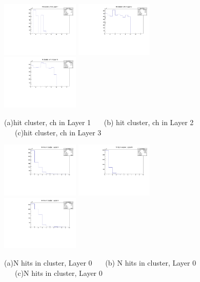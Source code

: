 \documentclass[a4paper,11pt]{article}
\theoremstyle{mytheor}
\begin{document}
\begin{figure}[H] 
\vspace*{-0.3cm} 
\includegraphics[width=0.33\textwidth,scale=0.5,trim=0 0 0 0,clip]{plotsdir/file0_clusters-hcL1Chs-1.pdf} 
\includegraphics[width=0.33\textwidth,scale=0.5,trim=0 0 0 0,clip]{plotsdir/file0_clusters-hcL2Chs-1.pdf} 
\includegraphics[width=0.33\textwidth,scale=0.5,trim=0 0 0 0,clip]{plotsdir/file0_clusters-hcL3Chs-1.pdf} 
\caption{(a)hit cluster, ch in Layer 1 ~~~(b) hit cluster, ch in Layer 2 ~~~(c)hit cluster, ch in Layer 3 } 
\end{figure} 
\begin{figure}[H] 
\vspace*{-0.3cm} 
\includegraphics[width=0.33\textwidth,scale=0.5,trim=0 0 0 0,clip]{plotsdir/file0_clusters-hcL0nHits-1.pdf} 
\includegraphics[width=0.33\textwidth,scale=0.5,trim=0 0 0 0,clip]{plotsdir/file0_clusters-hcL1nHits-1.pdf} 
\includegraphics[width=0.33\textwidth,scale=0.5,trim=0 0 0 0,clip]{plotsdir/file0_clusters-hcL2nHits-1.pdf} 
\caption{(a)N hits in cluster, Layer 0 ~~~(b) N hits in cluster, Layer 0 ~~~(c)N hits in cluster, Layer 0 } 
\end{figure} 
\end{document}
